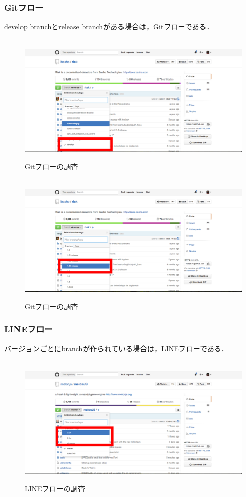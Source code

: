 \subsubsection{Gitフロー}
develop branchとrelease branchがある場合は，Gitフローである．
\begin{figure}[H]
\centering　
\includegraphics[width=13cm]{gitflow1.png}
\caption{Gitフローの調査}\label{tab:gitフロー1}
\end{figure}
\begin{figure}[H]
\centering　
\includegraphics[width=13cm]{gitflow2.png}
\caption{Gitフローの調査}\label{tab:gitフロー2}
\end{figure}

\subsubsection{LINEフロー}
バージョンごとにbranchが作られている場合は，LINEフローである．
\begin{figure}[H]
\centering　
\includegraphics[width=13cm]{lineflow.png}
\caption{LINEフローの調査}\label{tab:lineフロー}
\end{figure}

